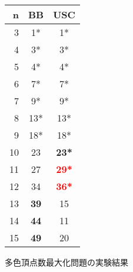 \begin{tabular}{r|c|c}
 \hline
 n&BB &USC\\
 \hline
 3&1*&1*\\
 4&3*&3*\\
 5&4*&4*\\
 6&7*&7*\\
 7&9*&9*\\
 8&13*&13*\\
 9&18*&18*\\
 10&23&\textbf{23*}\\
 11&27&\textbf{\textcolor{red}{29*}}\\
 12&34&\textbf{\textcolor{red}{36*}}\\
 13&\textbf{39}&15\\
 14&\textbf{44}&11\\
 15&\textbf{49}&20\\
\end{tabular}
 \caption{多色頂点数最大化問題の実験結果}
 \label{table:mult}
